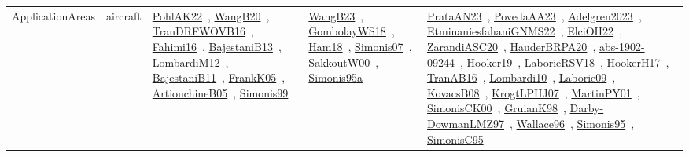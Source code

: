 {\begin{longtable}{lp{3cm}>{\raggedright\arraybackslash}p{6cm}>{\raggedright\arraybackslash}p{6cm}>{\raggedright\arraybackslash}p{8cm}}
ApplicationAreas & aircraft & \href{works/PohlAK22.pdf}{PohlAK22}~\cite{PohlAK22}, \href{works/WangB20.pdf}{WangB20}~\cite{WangB20}, \href{works/TranDRFWOVB16.pdf}{TranDRFWOVB16}~\cite{TranDRFWOVB16}, \href{works/Fahimi16.pdf}{Fahimi16}~\cite{Fahimi16}, \href{works/BajestaniB13.pdf}{BajestaniB13}~\cite{BajestaniB13}, \href{works/LombardiM12.pdf}{LombardiM12}~\cite{LombardiM12}, \href{works/BajestaniB11.pdf}{BajestaniB11}~\cite{BajestaniB11}, \href{works/FrankK05.pdf}{FrankK05}~\cite{FrankK05}, \href{works/ArtiouchineB05.pdf}{ArtiouchineB05}~\cite{ArtiouchineB05}, \href{works/Simonis99.pdf}{Simonis99}~\cite{Simonis99} & \href{works/WangB23.pdf}{WangB23}~\cite{WangB23}, \href{works/GombolayWS18.pdf}{GombolayWS18}~\cite{GombolayWS18}, \href{works/Ham18.pdf}{Ham18}~\cite{Ham18}, \href{works/Simonis07.pdf}{Simonis07}~\cite{Simonis07}, \href{works/SakkoutW00.pdf}{SakkoutW00}~\cite{SakkoutW00}, \href{works/Simonis95a.pdf}{Simonis95a}~\cite{Simonis95a} & \href{works/PrataAN23.pdf}{PrataAN23}~\cite{PrataAN23}, \href{works/PovedaAA23.pdf}{PovedaAA23}~\cite{PovedaAA23}, \href{works/Adelgren2023.pdf}{Adelgren2023}~\cite{Adelgren2023}, \href{works/EtminaniesfahaniGNMS22.pdf}{EtminaniesfahaniGNMS22}~\cite{EtminaniesfahaniGNMS22}, \href{works/ElciOH22.pdf}{ElciOH22}~\cite{ElciOH22}, \href{works/ZarandiASC20.pdf}{ZarandiASC20}~\cite{ZarandiASC20}, \href{works/HauderBRPA20.pdf}{HauderBRPA20}~\cite{HauderBRPA20}, \href{works/abs-1902-09244.pdf}{abs-1902-09244}~\cite{abs-1902-09244}, \href{works/Hooker19.pdf}{Hooker19}~\cite{Hooker19}, \href{works/LaborieRSV18.pdf}{LaborieRSV18}~\cite{LaborieRSV18}, \href{works/HookerH17.pdf}{HookerH17}~\cite{HookerH17}, \href{works/TranAB16.pdf}{TranAB16}~\cite{TranAB16}, \href{works/Lombardi10.pdf}{Lombardi10}~\cite{Lombardi10}, \href{works/Laborie09.pdf}{Laborie09}~\cite{Laborie09}, \href{works/KovacsB08.pdf}{KovacsB08}~\cite{KovacsB08}, \href{works/KrogtLPHJ07.pdf}{KrogtLPHJ07}~\cite{KrogtLPHJ07}, \href{works/MartinPY01.pdf}{MartinPY01}~\cite{MartinPY01}, \href{works/SimonisCK00.pdf}{SimonisCK00}~\cite{SimonisCK00}, \href{works/GruianK98.pdf}{GruianK98}~\cite{GruianK98}, \href{works/Darby-DowmanLMZ97.pdf}{Darby-DowmanLMZ97}~\cite{Darby-DowmanLMZ97}, \href{works/Wallace96.pdf}{Wallace96}~\cite{Wallace96}, \href{works/Simonis95.pdf}{Simonis95}~\cite{Simonis95}, \href{works/SimonisC95.pdf}{SimonisC95}~\cite{SimonisC95}\\

\end{longtable}}
